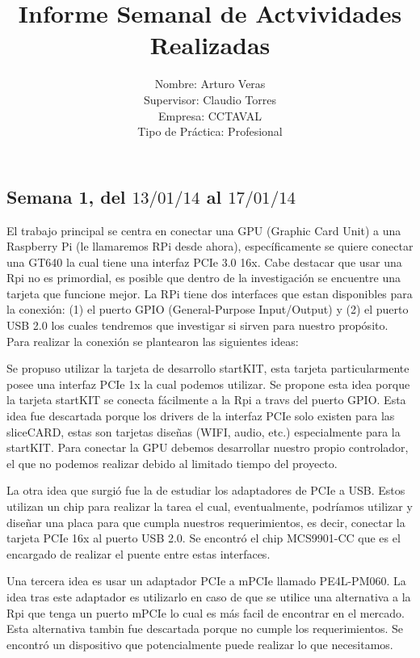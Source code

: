 \documentclass[11pt,twoside]{report}
\begin{document}
\title{\color{red}Informe Semanal de Actvividades Realizadas}
\author{Nombre: Arturo Veras\\ 
Supervisor: Claudio Torres\\
Empresa: CCTAVAL\\
Tipo de Práctica: Profesional}
\maketitle
%
\subsection*{Semana 1,  del $13/01/14$ al $17/01/14$}

El trabajo principal se centra en conectar una GPU (Graphic Card Unit) a una
Raspberry Pi (le llamaremos RPi desde ahora), específicamente se quiere
conectar una GT640 la cual tiene una interfaz PCIe 3.0 16x. Cabe destacar que
usar una Rpi no es primordial, es posible que dentro de la investigación se
encuentre una tarjeta que funcione mejor.  La RPi tiene dos interfaces que
estan disponibles para la conexión: (1) el puerto GPIO (General-Purpose
Input/Output) y (2) el puerto USB 2.0 los cuales tendremos que investigar si
sirven para nuestro propósito.  Para realizar la conexión se plantearon las
siguientes ideas:

Se propuso utilizar la tarjeta de desarrollo startKIT, esta tarjeta
particularmente posee una interfaz PCIe  1x la cual podemos utilizar.  Se
propone esta idea porque la tarjeta startKIT se conecta fácilmente a la Rpi a
travs del puerto GPIO.  Esta idea fue descartada porque los drivers de la
interfaz PCIe solo existen para las sliceCARD, estas son tarjetas diseñas
(WIFI, audio, etc.) especialmente para la startKIT. Para conectar la GPU
debemos desarrollar nuestro propio controlador, el que no podemos realizar
debido al limitado tiempo del proyecto.  

La otra idea que surgió fue la de estudiar los adaptadores de PCIe a USB. Estos
utilizan un chip para realizar la tarea el cual, eventualmente, podríamos
utilizar y diseñar una placa para que cumpla nuestros requerimientos, es decir,
conectar la tarjeta PCIe 16x al puerto USB 2.0. Se encontró el chip MCS9901-CC
que es el encargado de realizar el puente entre estas interfaces.  

Una tercera idea es usar un adaptador PCIe a mPCIe llamado PE4L-PM060.  La idea
tras este adaptador es utilizarlo en caso de que se utilice una alternativa a
la Rpi que tenga un puerto mPCIe lo cual es más facil de encontrar en el
mercado.  Esta alternativa tambin fue descartada porque no cumple los
requerimientos. Se encontró un dispositivo que potencialmente puede realizar lo
que necesitamos. 
\end{document}
